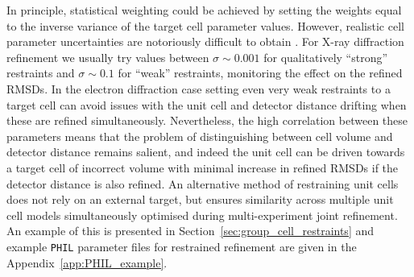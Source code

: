 \documentclass[preprint]{iucr}
\newcommand{\code}{\texttt}
\begin{document}
In principle, statistical weighting could be achieved by
setting the weights equal to the inverse variance of the target cell parameter
values. However, realistic cell parameter uncertainties are notoriously
difficult to obtain \cite{Dauter2015}. For X-ray diffraction refinement we
usually try values between $\sigma \sim 0.001$ for qualitatively ``strong''
restraints and $\sigma \sim 0.1$ for ``weak'' restraints, monitoring the
effect on the refined RMSDs. In the electron diffraction case setting even very
weak restraints to a target cell can avoid issues with the unit cell and
detector distance drifting when these are refined simultaneously. Nevertheless,
the high correlation between these parameters means that the problem of
distinguishing between cell volume and detector distance remains salient, and
indeed the unit cell can be driven towards a target cell of incorrect volume
with minimal increase in refined RMSDs if the detector distance is also
refined. An alternative method of restraining unit cells does not rely on an
external target, but ensures similarity across multiple unit cell models
simultaneously optimised during multi-experiment joint refinement. An example
of this is presented in Section~\ref{sec:group_cell_restraints} and example
\code{PHIL} parameter files for restrained refinement are given in the
Appendix~\ref{app:PHIL_example}.
\end{document}
